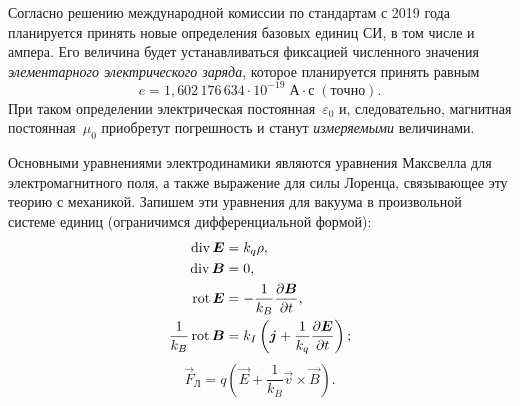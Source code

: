 \begin{lab:note}
Согласно решению международной комиссии по стандартам с 2019 года
планируется принять новые определения базовых единиц СИ, в том числе и ампера.
Его величина будет устанавливаться фиксацией численного значения
\emph{элементарного электрического заряда}, которое
планируется принять равным
\[
e = 1,602\,176\,634\cdot 10^{-19}\;\text{А}\cdot\text{с}\;(точно).
\]
При таком определении электрическая постоянная~$\varepsilon_0$ и, следовательно,
магнитная постоянная~$\mu_0$ приобретут погрешность и 
станут \emph{измеряемыми} величинами.
\end{lab:note}


Основными уравнениями электродинамики являются уравнения Максвелла
для электромагнитного поля, а также выражение для силы Лоренца, связывающее
эту теорию с механикой. Запишем эти уравнения для вакуума в произвольной
системе единиц (ограничимся дифференциальной формой):
\begin{align}
\mathop{\mathrm{div}} {\boldsymbol{E}} & =k_{q}\rho,\label{eq:gauss}\\
\mathop{\mathrm{div}} {\boldsymbol{B}} & =0,\\
\mathop{\mathrm{rot}} {\boldsymbol{E}} & =-\frac{1}{k_{B}}\frac{\partial{\boldsymbol{B}}}{\partial t},\label{eq:faradey}\\
\frac{1}{k_B}\mathop{\mathrm{rot}} {\boldsymbol{B}} & =k_{I}\left({\boldsymbol{j}}+\frac{1}{k_{q}}\frac{\partial{\boldsymbol{E}}}{\partial t}\right);\label{eq:ampere-dif}
\end{align}
\begin{equation}
\vec{F}_Л=q\left(\vec{E}+\frac{1}{k_{B}}\vec{v}\times\vec{B}\right).\label{eq:lorentz}
\end{equation}

